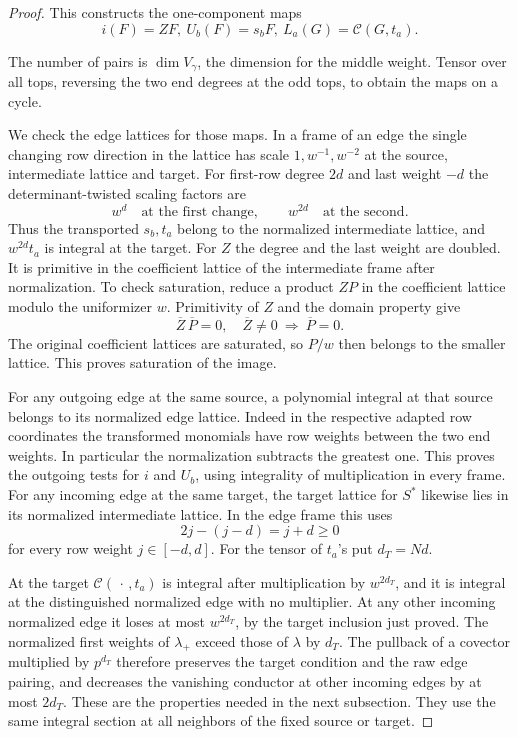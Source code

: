 \begin{proof}
This constructs the one-component maps
\[
 i(F)=ZF,\ U_b(F)=s_b F,\ L_a(G)=\mathcal C(G,t_a).
\]

The number of pairs is \(\dim V_\gamma\), the dimension for
the middle weight. Tensor over all tops, reversing the two
end degrees at the odd tops, to obtain the maps on a cycle.

We check the edge lattices for those maps. In a frame of an
edge the single changing row direction in the lattice has
scale \(1,w^{-1},w^{-2}\) at the source, intermediate
lattice and target. For first-row degree \(2d\) and last weight \(-d\) the determinant-twisted scaling factors are
\[
 w^d\quad\text{at the first change},\qquad w^{2d}\quad\text{at the second}.
\]
Thus the transported
\(s_b,t_a\) belong to the normalized intermediate lattice,
and \(w^{2d}t_a\) is integral at the target.
For \(Z\) the degree and the last weight are doubled.
It is primitive in the coefficient lattice of the intermediate
frame after normalization. To check saturation, reduce a product \(ZP\) in the coefficient
lattice modulo the uniformizer \(w\). Primitivity of \(Z\) and the
domain property give
\[
 \overline Z\,\overline P=0,\quad\overline Z\ne0
       \ \Longrightarrow\ \overline P=0 .
\]
The original coefficient lattices are saturated, so \(P/w\) then
belongs to the smaller lattice. This proves saturation of the image.

For any outgoing edge at the same source, a polynomial
integral at that source belongs to its normalized edge
lattice. Indeed in the respective adapted row coordinates
the transformed monomials have row weights between the
two end weights. In particular the normalization subtracts
the greatest one. This proves the outgoing tests for
\(i\) and \(U_b\), using integrality of multiplication
in every frame. For any incoming edge at the same target,
the target lattice for \(S^*\) likewise lies in its
normalized intermediate lattice. In the edge frame this uses
\[
 2j-(j-d)=j+d\ge0
\]
for every row weight \(j\in[-d,d]\).
For the tensor of \(t_a\)'s put \(d_T=Nd\).

At the target \(\mathcal C(\,\cdot\,,t_a)\) is integral after
multiplication by \(w^{2d_T}\), and it is integral at the
distinguished normalized edge with no multiplier.
At any other incoming normalized edge it loses at most
\(w^{2d_T}\), by the target inclusion just proved.
The normalized first weights of \(\lambda_+\) exceed those
of \(\lambda\) by \(d_T\). The pullback of a covector
multiplied by \(p^{d_T}\) therefore preserves the target
condition and the raw edge pairing, and decreases the
vanishing conductor at other incoming edges by at most
\(2d_T\). These are the properties needed in the next
subsection. They use the same integral section at all
neighbors of the fixed source or target.
\end{proof}
